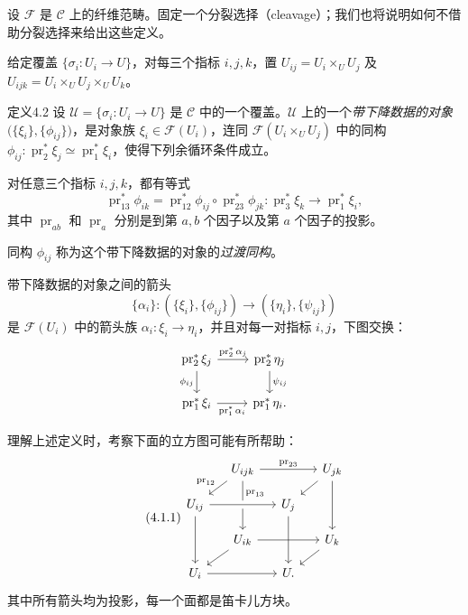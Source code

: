设 $\mathcal F$ 是 $\mathcal C$ 上的纤维范畴。固定一个分裂选择（cleavage）；我们也将说明如何不借助分裂选择来给出这些定义。

给定覆盖 $\{\sigma_i\colon U_i\to U\}$，对每三个指标 $i,j,k$，置 $U_{ij}=U_i\times_U U_j$ 及 $U_{ijk}=U_i\times_U U_j\times_U U_k$。

\begin{origstatement}{定义}{4.2}\label{ch04:def42}
设 $\mathcal U=\{\sigma_i\colon U_i\to U\}$ 是 $\mathcal C$ 中的一个覆盖。$\mathcal U$ 上的一个\emph{带下降数据的对象} $\bigl(\{\xi_i\},\{\phi_{ij}\}\bigr)$，是对象族 $\xi_i\in\mathcal F(U_i)$，连同 $\mathcal F(U_i\times_U U_j)$ 中的同构 $\phi_{ij}\colon\operatorname{pr}_2^*\xi_j\simeq\operatorname{pr}_1^*\xi_i$，使得下列余循环条件成立。

对任意三个指标 $i,j,k$，都有等式
\[
 \operatorname{pr}_{13}^*\phi_{ik}
 =\operatorname{pr}_{12}^*\phi_{ij}\circ\operatorname{pr}_{23}^*\phi_{jk}
 \colon\operatorname{pr}_3^*\xi_k\longrightarrow\operatorname{pr}_1^*\xi_i,
\]
其中 $\operatorname{pr}_{ab}$ 和 $\operatorname{pr}_a$ 分别是到第 $a,b$ 个因子以及第 $a$ 个因子的投影。

同构 $\phi_{ij}$ 称为这个带下降数据的对象的\emph{过渡同构}。

带下降数据的对象之间的箭头
\[
 \{\alpha_i\}\colon
 (\{\xi_i\},\{\phi_{ij}\})\longrightarrow(\{\eta_i\},\{\psi_{ij}\})
\]
是 $\mathcal F(U_i)$ 中的箭头族 $\alpha_i\colon\xi_i\to\eta_i$，并且对每一对指标 $i,j$，下图交换：
\[
\begin{tikzcd}
 \operatorname{pr}_2^*\xi_j\arrow[r,"{\operatorname{pr}_2^*\alpha_j}"]\arrow[d,"{\phi_{ij}}"'] & \operatorname{pr}_2^*\eta_j\arrow[d,"{\psi_{ij}}"]\\
 \operatorname{pr}_1^*\xi_i\arrow[r,"{\operatorname{pr}_1^*\alpha_i}"'] & \operatorname{pr}_1^*\eta_i.
\end{tikzcd}
\]
\end{origstatement}

理解上述定义时，考察下面的立方图可能有所帮助：
\begin{equation}\tag{4.1.1}\label{ch04:eq411}
\begin{tikzcd}[row sep=1.1em,column sep=1.3em]
 &U_{ijk}\arrow[rr,"{\operatorname{pr}_{23}}"]\arrow[dl,"{\operatorname{pr}_{12}}"']\arrow[dd,"{\operatorname{pr}_{13}}",near start]&&U_{jk}\arrow[dl]\arrow[dd]\\
 U_{ij}\arrow[rr,crossing over]\arrow[dd]&&U_j\arrow[dd]\\
 &U_{ik}\arrow[rr]\arrow[dl]&&U_k\arrow[dl]\\
 U_i\arrow[rr]&&U.
\end{tikzcd}
\end{equation}
其中所有箭头均为投影，每一个面都是笛卡儿方块。

